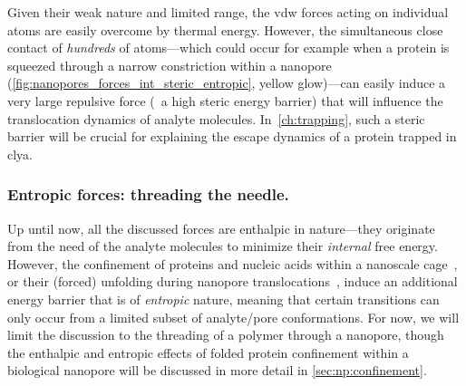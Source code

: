 Given their weak nature and limited range, the \gls{vdw} forces acting on individual atoms are easily overcome
by thermal energy. However, the simultaneous close contact of \emph{hundreds} of atoms---which could occur for
example when a protein is squeezed through a narrow constriction within a nanopore
(\cref{fig:nanopores_forces_int_steric_entropic}, yellow glow)---can easily induce a very large repulsive
force (\ie~a high steric energy barrier) that will influence the translocation dynamics of analyte molecules.
In~\cref{ch:trapping}, such a steric barrier will be crucial for explaining the escape dynamics of a protein
trapped in \gls{clya}.


\subsubsection{Entropic forces: threading the needle.}
%

Up until now, all the discussed forces are enthalpic in nature---they originate from the need of the analyte
molecules to minimize their \emph{internal} free energy. However, the confinement of proteins and nucleic
acids within a nanoscale cage~\cite{Liu-2015b}, or their (forced) unfolding during nanopore
translocations~\cite{Muthukumar-2010,Cressiot-2012,Cressiot-2015}, induce an additional energy barrier that is
of \emph{entropic} nature, meaning that certain transitions can only occur from a limited subset of
analyte/pore conformations. For now, we will limit the discussion to the threading of a polymer through a
nanopore, though the enthalpic and entropic effects of folded protein confinement within a biological nanopore
will be discussed in more detail in \cref{sec:np:confinement}.

